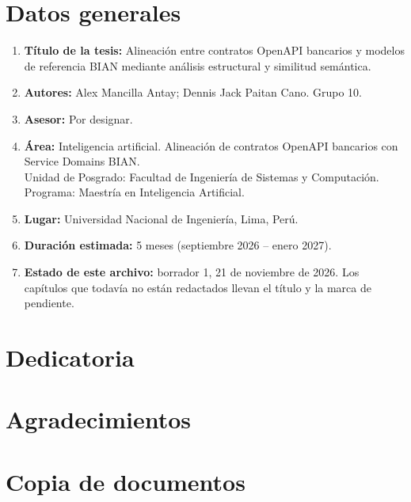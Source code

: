 \chapter*{Datos generales}

\begin{enumerate}[leftmargin=1.4em]
  \item \textbf{Título de la tesis:} Alineación entre contratos OpenAPI bancarios y modelos de referencia BIAN mediante análisis estructural y similitud semántica.
  \item \textbf{Autores:} Alex Mancilla Antay; Dennis Jack Paitan Cano. Grupo 10.
  \item \textbf{Asesor:} Por designar.
  \item \textbf{Área:} Inteligencia artificial. Alineación de contratos OpenAPI bancarios con Service Domains BIAN.\\
        Unidad de Posgrado: Facultad de Ingeniería de Sistemas y Computación.\\
        Programa: Maestría en Inteligencia Artificial.
  \item \textbf{Lugar:} Universidad Nacional de Ingeniería, Lima, Perú.
  \item \textbf{Duración estimada:} 5 meses (septiembre 2026 -- enero 2027).
  \item \textbf{Estado de este archivo:} borrador 1, 21 de noviembre de 2026. Los capítulos que todavía no están redactados llevan el título y la marca de pendiente.
\end{enumerate}

\chapter*{Dedicatoria}
\pendiente

\chapter*{Agradecimientos}
\pendiente

\chapter*{Copia de documentos}
\pendiente

\tableofcontents

\listoftables
{}

